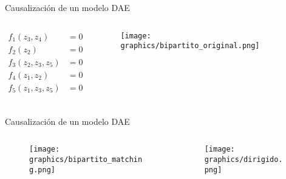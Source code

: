 \begin{frame}[fragile]{Causalización de un modelo DAE}
    \begin{columns}
        \begin{column}{0.5\textwidth}
          \centering
          \begin{align*}
            f_1(z_3,z_4) &= 0 \\
            f_2(z_2) &= 0 \\
            f_3(z_2,z_3,z_5) &= 0 \\
            f_4(z_1,z_2) &= 0 \\
            f_5(z_1,z_3,z_5) &= 0 \\
          \end{align*}
        \end{column}
        \begin{column}{0.5\textwidth}
        \begin{figure}
           \centering
           \texttt{[image: graphics/bipartito\_original.png]}
        \end{figure}
        \end{column}
    \end{columns}
\end{frame}

\begin{frame}[fragile]{Causalización de un modelo DAE}
    \begin{columns}
        \begin{column}{0.5\textwidth}
        \begin{figure}
           \centering
           \texttt{[image: graphics/bipartito\_matching.png]}
        \end{figure}
        \end{column}
        \begin{column}{0.5\textwidth}
        \begin{figure}
           \centering
           \texttt{[image: graphics/dirigido.png]}
        \end{figure}
        \end{column}
    \end{columns}
\end{frame}

